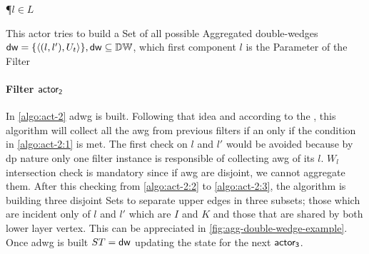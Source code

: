 \begin{algorithm}
\P{$l \in L$}
\BlankLine
{}
\PC{$|\dwi| \geq 1 \lor \fid$}
\caption{This actor tries to build a Set of all possible Aggregated double-wedges $\mathsf{dw} = \{\left\langle (l,l'), U_t \right\rangle\}, \mathsf{dw} \subseteq \mathbb{DW}$, which first component $l$ is the Parameter of the Filter}
\label{algo:act-2}
\end{algorithm}

\paragraph{Filter $\mathsf{actor_2}$} In \autoref{algo:act-2} \acrshort{adwg} is built. Following that idea and according to the , this algorithm will collect all the \acrshort{awg} 
from previous filters if an only if the condition in \autoref{algo:act-2:1} is met. The first check on $l$ and $l'$ would be avoided because by \acrshort{dp} nature
only one filter instance is responsible of collecting \acrshort{awg} of its $l$. $W_l$ intersection check is mandatory since if \acrshort{awg} are disjoint, we cannot aggregate them.
After this checking from \autoref{algo:act-2:2} to \autoref{algo:act-2:3}, the algorithm is building three disjoint Sets to separate upper edges in three subsets; those which are incident only of 
$l$ and $l'$ which are $I$ and $K$ and those that are shared by both lower layer vertex. This can be appreciated in \autoref{fig:agg-double-wedge-example}.
Once \acrshort{adwg} is built $ST = \mathsf{dw}$ updating the state for the next $\mathsf{actor_3}$.

